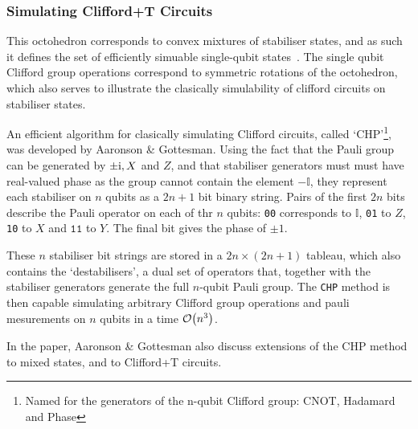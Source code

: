 \documentclass{standalone}
\begin{document}
\subsubsection{Simulating Clifford+T Circuits}\label{sec:CHP}
This octohedron corresponds to convex mixtures of stabiliser states, and as such it defines the set of efficiently simuable single-qubit states~\cite{Howard2014}. The single qubit Clifford group operations correspond to symmetric rotations of the octohedron, which also serves to illustrate the clasically simulability of clifford circuits on stabiliser states. 
\par
An efficient algorithm for clasically simulating Clifford circuits, called `CHP'\footnote{Named for the generators of the n-qubit Clifford group: CNOT, Hadamard and Phase}, was developed by Aaronson \& Gottesman. Using the fact that the Pauli group can be generated by $\pm\mathrm{i}, X$ and $Z$, and that stabiliser generators must must have real-valued phase as the group cannot contain the element $-\mathbb{I}$, they represent each stabiliser on $n$ qubits as a $2n+1$ bit binary string. Pairs of the first $2n$ bits describe the Pauli operator on each of thr $n$ qubits: \texttt{00} corresponds to $\mathbb{I}$, \texttt{01} to $Z$, \texttt{10} to $X$ and $\texttt{11}$ to $Y$. The final bit gives the phase of $\pm 1$.
\par
These $n$ stabiliser bit strings are stored in a $2n\times(2n+1)$ tableau, which also contains the `destabilisers', a dual set of operators that, together with the stabiliser generators generate the full $n$-qubit Pauli group. The \texttt{CHP} method is then capable simulating arbitrary Clifford group operations and pauli mesurements on $n$ qubits in a time $\order{n^{3}}$.
\par
In the paper, Aaronson \& Gottesman also discuss extensions of the CHP method to mixed states, and to Clifford+T circuits. 
\ifstandalone

\fi
\end{document}
